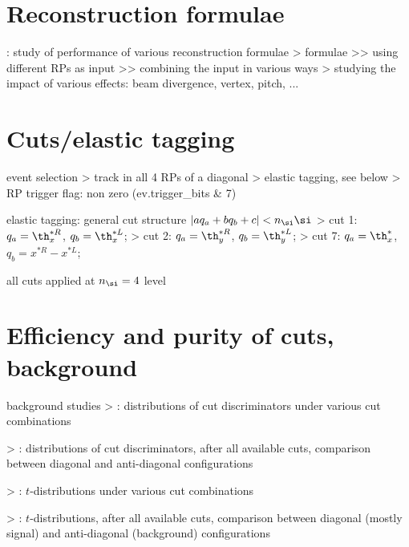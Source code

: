 \section{Reconstruction formulae}

\>  : study of performance of various reconstruction formulae
\>> formulae
\>>> using different RPs as input
\>>> combining the input in various ways
\>> studying the impact of various effects: beam divergence, vertex, pitch, ...

\section{Cuts/elastic tagging}

\> event selection
\>> track in all 4 RPs of a diagonal
\>> elastic tagging, see below
\>> RP trigger flag: non zero (ev.trigger\_bits \& 7)

\> elastic tagging: general cut structure $| a q_a + b q_b + c| < n_\si  \si$
\>> cut 1: $q_a = \th_x^{*R}$, $q_b = \th_x^{*L}$; 
\>> cut 2: $q_a = \th_y^{*R}$, $q_b = \th_y^{*L}$; 
\>> cut 7: $q_a = \th_x^*$, $q_b = x^{*R} - x^{*L}$; 

\> all cuts applied at $n_\si = 4$ level


\section{Efficiency and purity of cuts, background}

\> background studies
\>> : distributions of cut discriminators under various cut combinations

\>> : distributions of cut discriminators, after all available cuts, comparison between diagonal and anti-diagonal configurations

\>> : $t$-distributions under various cut combinations

\>> : $t$-distributions, after all available cuts, comparison between diagonal (mostly signal) and anti-diagonal (background) configurations


